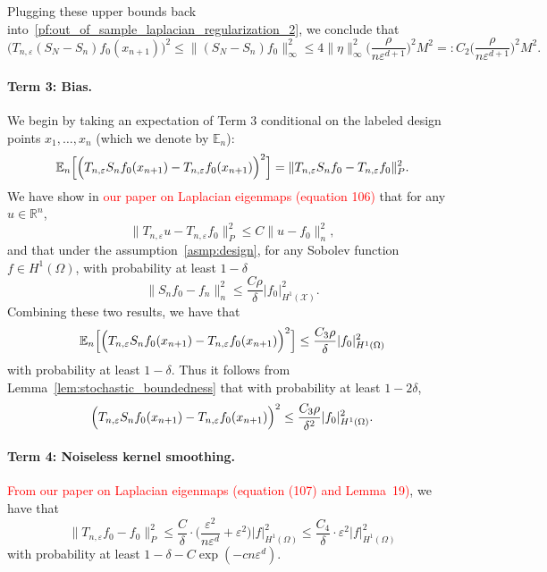 \documentclass{article}
\newcommand{\Reals}{\mathbb{R}}
\newcommand{\1}{\mathbf{1}}
\newcommand{\mc}[1]{\mathcal{#1}}
\newcommand{\Ebb}{\mathbb{E}}
\theoremstyle{alden}
\theoremstyle{aldenthm}
\theoremstyle{definition}
\theoremstyle{remark}
\begin{document}
Plugging these upper bounds back into~\eqref{pf:out_of_sample_laplacian_regularization_2}, we conclude that
\begin{equation*}
\bigl(T_{n,\varepsilon}(S_N - S_n)f_0(x_{n + 1})\bigr)^2 \leq \|(S_N - S_n)f_0\|_{\infty}^2 \leq 4 \|\eta\|_{\infty}^2\biggl(\frac{\rho}{n\varepsilon^{d + 1}}\biggr)^2M^2 =: C_2 \biggl(\frac{\rho}{n\varepsilon^{d + 1}}\biggr)^2M^2.
\end{equation*}

\paragraph{Term 3: Bias.}
We begin by taking an expectation of Term 3 conditional on the labeled design points $x_1,\ldots,x_n$ (which we denote by $\Ebb_n$):
\begin{equation*}
\Ebb_n\Bigl[\Bigl(T_{n,\varepsilon}S_nf_0(x_{n + 1}) - T_{n,\varepsilon}f_0(x_{n + 1})\Bigr)^2\Bigr] = \|T_{n,\varepsilon}S_nf_0 - T_{n,\varepsilon}f_0\|_P^2.
\end{equation*}
We have show in \textcolor{red}{our paper on Laplacian eigenmaps (equation 106)} that for any $u \in \Reals^n$,
\begin{equation*}
\|T_{n,\varepsilon}u - T_{n,\varepsilon}f_0\|_P^2 \leq C \|u - f_0\|_n^2,
\end{equation*}
and that under the assumption~\ref{asmp:design}, for any Sobolev function $f \in H^1(\Omega)$, with probability at least $1 - \delta$
\begin{equation*}
\|S_nf_0 -f_n\|_n^2 \leq \frac{C\rho}{\delta}|f_0|_{H^1(\mc{X})}^2.
\end{equation*}
Combining these two results, we have that
\begin{equation*}
\Ebb_n\Bigl[\Bigl(T_{n,\varepsilon}S_nf_0(x_{n + 1}) - T_{n,\varepsilon}f_0(x_{n + 1})\Bigr)^2\Bigr] \leq \frac{C_3\rho}{\delta}|f_0|_{H^1(\Omega)}^2
\end{equation*}                                                                          
with probability at least $1 - \delta$. Thus it follows from Lemma~\ref{lem:stochastic_boundedness} that with probability at least $1 - 2\delta$,
\begin{equation*}
\Bigl(T_{n,\varepsilon}S_nf_0(x_{n + 1}) - T_{n,\varepsilon}f_0(x_{n + 1})\Bigr)^2 \leq \frac{C_3\rho}{\delta^2}|f_0|_{H^1(\Omega)}^2.
\end{equation*}
              
\paragraph{Term 4: Noiseless kernel smoothing.}
\textcolor{red}{From our paper on Laplacian eigenmaps (equation (107) and Lemma~19)}, we have that
\begin{equation*}
\|T_{n,\varepsilon}f_0 - f_0\|_P^2 \leq \frac{C}{\delta} \cdot \biggl(\frac{\varepsilon^2}{n\varepsilon^d} + \varepsilon^2\biggr) |f|_{H^1(\Omega)}^2 \leq \frac{C_4}{\delta} \cdot \varepsilon^2 |f|_{H^1(\Omega)}^2
\end{equation*}
with probability at least $1 - \delta - C\exp(-cn\varepsilon^d)$. 
\end{document}
